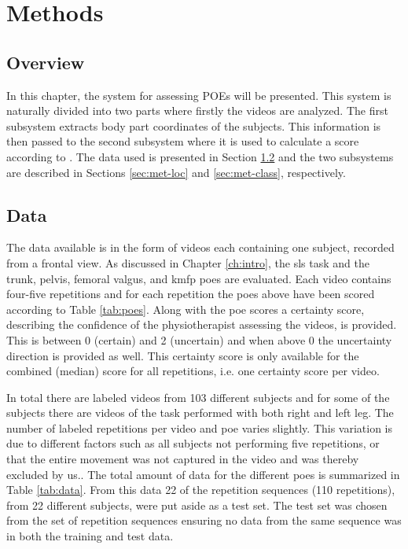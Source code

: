 \chapter{Methods} \label{ch:method}
\section{Overview}
In this chapter, the system for assessing POEs will be presented. This system is naturally divided into two parts where firstly the videos are analyzed. The first subsystem extracts body part coordinates of the subjects. This information is then passed to the second subsystem where it is used to calculate a score according to \cite{Nae2020b}. The data used is presented in Section \ref{sec:met-data} and the two subsystems are described in Sections \ref{sec:met-loc} and \ref{sec:met-class}, respectively.

\section{Data}\label{sec:met-data}
The data available is in the form of videos each containing one subject, recorded from a frontal view. As discussed in Chapter \ref{ch:intro}, the \gls{sls} task and the trunk, pelvis, femoral valgus, and \gls{kmfp} \glspl{poe} are evaluated. Each video contains four-five repetitions and for each repetition the \glspl{poe} above have been scored according to Table \ref{tab:poes}. Along with the \gls{poe} scores a certainty score, describing the confidence of the physiotherapist assessing the videos, is provided. This is between 0 (certain) and 2 (uncertain) and when above 0 the uncertainty direction is provided as well. This certainty score is only available for the combined (median) score for all repetitions, i.e. one certainty score per video.

In total there are labeled videos from 103 different subjects and for some of the subjects there are videos of the task performed with both right and left leg. The number of labeled repetitions per video and \gls{poe} varies slightly. This variation is due to different factors such as all subjects not performing five repetitions, or that the entire movement was not captured in the video and was thereby excluded by us.. The total amount of data for the different \glspl{poe} is summarized in Table \ref{tab:data}. From this data 22 of the repetition sequences (110 repetitions), from 22 different subjects, were put aside as a test set. The test set was chosen from the set of repetition sequences ensuring no data from the same sequence was in both the training and test data.

